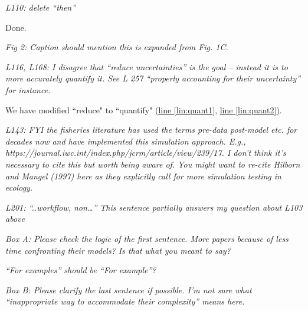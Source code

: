 \documentclass[11pt,letter]{article}
\begin{document}
\begin{mybox}
\emph{L110: delete “then”}
\end{mybox}

Done. %

\begin{mybox}
\emph{Fig 2: Caption should mention this is expanded from Fig. 1C.}
\end{mybox}


\begin{mybox}
\emph{L116, L168: I disagree that “reduce uncertainties” is the goal – instead it is to more accurately quantify it. See L 257 “properly accounting for their uncertainty” for instance.}
\end{mybox}

We have modified ``reduce" to ``quantify" (\href{file:forecastflows_r1\#lintarget:quant1}{line \ref*{lin:quant1}}, \href{file:forecastflows_r1\#lintarget:quant2}{line \ref*{lin:quant2}}).

\begin{mybox}
\emph{L143: FYI the fisheries literature has used the terms pre-data post-model etc. for decades now and have implemented this simulation approach. E.g., https://journal.iwc.int/index.php/jcrm/article/view/239/17. I don’t think it’s necessary to cite this but worth being aware of. You might want to re-cite Hilborn and Mangel (1997) here as they explicitly call for more simulation testing in ecology.}
\end{mybox}

\begin{mybox}
\emph{L201: “..workflow, non…” This sentence partially answers my question about L103 above}
\end{mybox}

\begin{mybox}
\emph{Box A: Please check the logic of the first sentence. More papers because of less time confronting their models? Is that what you meant to say?}
\end{mybox} 

\begin{mybox}
\emph{“For examples” should be “For example”?}
\end{mybox} 


\begin{mybox}
\emph{Box B: Please clarify the last sentence if possible. I’m not sure what “inappropriate way to accommodate their complexity” means here.}
\end{mybox}
\end{document}
